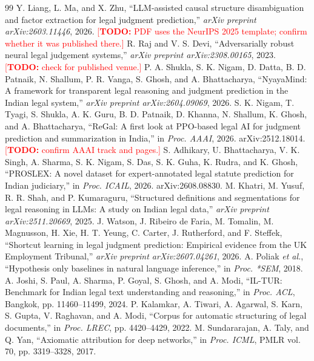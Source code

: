 \documentclass[conference]{IEEEtran}
\newcommand{\TODO}[1]{\textcolor{red}{[\textbf{TODO:} #1]}}
\begin{document}
\begin{thebibliography}{99}
 Y. Liang, L. Ma, and X. Zhu, ``LLM-assisted causal structure disambiguation and factor extraction for legal judgment prediction,'' \textit{arXiv preprint arXiv:2603.11446}, 2026. \TODO{PDF uses the NeurIPS 2025 template; confirm whether it was published there.}
 R. Raj and V. S. Devi, ``Adversarially robust neural legal judgement systems,'' \textit{arXiv preprint arXiv:2308.00165}, 2023. \TODO{check for published venue.}
 P. A. Shukla, S. K. Nigam, D. Datta, B. D. Patnaik, N. Shallum, P. R. Vanga, S. Ghosh, and A. Bhattacharya, ``NyayaMind: A framework for transparent legal reasoning and judgment prediction in the Indian legal system,'' \textit{arXiv preprint arXiv:2604.09069}, 2026.
 S. K. Nigam, T. Tyagi, S. Shukla, A. K. Guru, B. D. Patnaik, D. Khanna, N. Shallum, K. Ghosh, and A. Bhattacharya, ``ReGal: A first look at PPO-based legal AI for judgment prediction and summarization in India,'' in \textit{Proc. AAAI}, 2026. arXiv:2512.18014. \TODO{confirm AAAI track and pages.}
 S. Adhikary, U. Bhattacharya, V. K. Singh, A. Sharma, S. K. Nigam, S. Das, S. K. Guha, K. Rudra, and K. Ghosh, ``PROSLEX: A novel dataset for expert-annotated legal statute prediction for Indian judiciary,'' in \textit{Proc. ICAIL}, 2026. arXiv:2608.08830.
 M. Khatri, M. Yusuf, R. R. Shah, and P. Kumaraguru, ``Structured definitions and segmentations for legal reasoning in LLMs: A study on Indian legal data,'' \textit{arXiv preprint arXiv:2511.20669}, 2025.
 J. Watson, J. Ribeiro de Faria, M. Tomalin, M. Magnusson, H. Xie, H. T. Yeung, C. Carter, J. Rutherford, and F. Steffek, ``Shortcut learning in legal judgment prediction: Empirical evidence from the UK Employment Tribunal,'' \textit{arXiv preprint arXiv:2607.04261}, 2026.
 A. Poliak \textit{et al.}, ``Hypothesis only baselines in natural language inference,'' in \textit{Proc. *SEM}, 2018.
 A. Joshi, S. Paul, A. Sharma, P. Goyal, S. Ghosh, and A. Modi, ``IL-TUR: Benchmark for Indian legal text understanding and reasoning,'' in \textit{Proc. ACL}, Bangkok, pp. 11460--11499, 2024.
 P. Kalamkar, A. Tiwari, A. Agarwal, S. Karn, S. Gupta, V. Raghavan, and A. Modi, ``Corpus for automatic structuring of legal documents,'' in \textit{Proc. LREC}, pp. 4420--4429, 2022.
 M. Sundararajan, A. Taly, and Q. Yan, ``Axiomatic attribution for deep networks,'' in \textit{Proc. ICML}, PMLR vol. 70, pp. 3319--3328, 2017.
\end{thebibliography}
\end{document}
